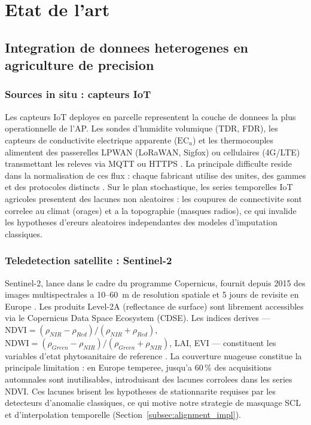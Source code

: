\documentclass[12pt,a4paper]{article}
\theoremstyle{plain}
\theoremstyle{definition}
\theoremstyle{remark}
\begin{document}
\section{Etat de l'art}
\label{sec:related}

\subsection{Integration de donnees heterogenes en agriculture de precision}

\subsubsection{Sources in situ : capteurs IoT}

Les capteurs IoT deployes en parcelle representent la couche de donnees
la plus operationnelle de l'AP. Les sondes d'humidite volumique (TDR,
FDR), les capteurs de conductivite electrique apparente ($\text{EC}_a$)
et les thermocouples alimentent des passerelles LPWAN (LoRaWAN, Sigfox)
ou cellulaires (4G/LTE) transmettant les releves via MQTT ou HTTPS
\cite{iot_review_2025,iot_frontiers_2025}. La principale difficulte
reside dans la normalisation de ces flux : chaque fabricant utilise
des unites, des gammes et des protocoles distincts
\cite{iot_agronomy_2023}. Sur le plan stochastique, les series temporelles
IoT agricoles presentent des lacunes non aleatoires : les coupures de
connectivite sont correlee au climat (orages) et a la topographie
(masques radios), ce qui invalide les hypotheses d'ereurs aleatoires
independantes des modeles d'imputation classiques.

\subsubsection{Teledetection satellite : Sentinel-2}

Sentinel-2, lance dans le cadre du programme Copernicus, fournit depuis
2015 des images multispectrales a 10--60~m de resolution spatiale et
5 jours de revisite en Europe \cite{sentinel2_ard_2022}.
Les produits Level-2A (reflectance de surface) sont librement accessibles
via le Copernicus Data Space Ecosystem (CDSE). Les indices derives ---
$\text{NDVI} = (\rho_{NIR}-\rho_{Red})/(\rho_{NIR}+\rho_{Red})$,
$\text{NDWI} = (\rho_{Green}-\rho_{NIR})/(\rho_{Green}+\rho_{NIR})$,
LAI, EVI --- constituent les variables d'etat phytosanitaire de reference
\cite{ndvi_sentinel2_2023,ndvi_timeseries_2022}.
La couverture nuageuse constitue la principale limitation : en Europe
temperee, jusqu'a 60\,\% des acquisitions automnales sont inutilisables,
introduisant des lacunes corrolees dans les series NDVI. Ces lacunes
brisent les hypotheses de stationnarite requises par les detecteurs
d'anomalie classiques, ce qui motive notre strategie de masquage SCL
et d'interpolation temporelle (Section~\ref{subsec:alignment_impl}).
\end{document}
